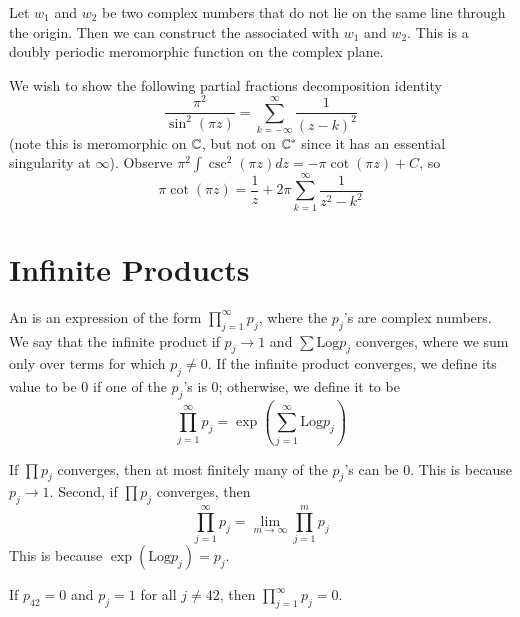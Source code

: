 \documentclass[12pt, a4paper, oneside, openright, titlepage]{book}
\begin{document}
Let $w_1$ and $w_2$ be two complex numbers that do not lie on the same line through the origin. Then we can construct the  associated with $w_1$ and $w_2$. This is a doubly periodic meromorphic function on the complex plane.


\begin{eg}
    We wish to show the following partial fractions decomposition identity \begin{equation*}
        \frac{\pi^2}{\sin^2(\pi z)} = \sum_{k=-\infty}^{\infty}\frac{1}{(z-k)^2}
    \end{equation*}
    (note this is meromorphic on $\mathbb C$, but not on $\mathbb C^*$ since it has an essential singularity at $\infty$). Observe $\pi^2\int\csc^2(\pi z)dz = -\pi\cot(\pi z)+C$, so \begin{equation*}
        \pi\cot(\pi z) = \frac{1}{z}+2\pi\sum_{k=1}^{\infty}\frac{1}{z^2-k^2}
    \end{equation*}
\end{eg}



\section{Infinite Products}

\begin{defn}
    An  is an expression of the form $\prod_{j=1}^{\infty}p_j$, where the $p_j$'s are complex numbers. We say that the infinite product  if $p_j\rightarrow 1$ and $\sum\text{Log}p_j$ converges, where we sum only over terms for which $p_j\neq 0$. If the infinite product converges, we define its value to be $0$ if one of the $p_j$'s is $0$; otherwise, we define it to be \begin{equation*}
        \prod_{j=1}^{\infty}p_j = \exp\left(\sum_{j=1}^{\infty}\text{Log}p_j\right)
    \end{equation*}
\end{defn}

If $\prod p_j$ converges, then at most finitely many of the $p_j$'s can be $0$. This is because $p_j\rightarrow 1$. Second, if $\prod p_j$ converges, then \begin{equation*}
    \prod_{j=1}^{\infty}p_j = \lim\limits_{m\rightarrow \infty}\prod_{j=1}^mp_j
\end{equation*}
This is because $\exp(\text{Log}p_j) = p_j$.

\begin{eg}
    If $p_{42} = 0$ and $p_j = 1$ for all $j \neq 42$, then $\prod_{j=1}^{\infty}p_j = 0$.
\end{eg}
\end{document}
